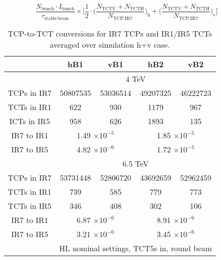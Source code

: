 \begin{equation} \label{eq3}
\frac{N_{\mathrm{bunch}} \cdot I_{\mathrm{bunch}}}{\tau_{\mathrm{stable \, beam}}} \times \Bigg[ \frac{1}{2} \cdot \Big( \frac{N_{\mathrm{TCTV}} + N_{\mathrm{TCTH}}}{N_{\mathrm{TCP.IR7}}}\Big)_{\mathrm{h}} + \Big( \frac{N_{\mathrm{TCTV}} + N_{\mathrm{TCTH}}}{N_{\mathrm{TCP.IR7}}} \Big)_{\mathrm{v}}  \Bigg]
\end{equation}

\begin{table}
   \centering
   \caption{TCP-to-TCT conversions for IR7 TCPs and IR1/IR5 TCTs averaged over simulation h+v case.}

   \begin{tabular}{c|cc|cc}

       & hB1 & vB1 & hB2 & vB2\\ \hline       
       & \multicolumn{4}{c}{4 TeV} \\   %
       TCPs in IR7 & 50807535 & 53036514 & 49207325 & 46222723 \\
       TCTs in IR1 & 622 & 930 & 1179 & 967 \\
       ICTs in IR5 & 958 & 626 & 1893 & 135 \\ %
       IR7 to IR1  & \multicolumn{2}{c|}{1.49 $\times 10^{-5}$} & \multicolumn{2}{c}{1.85 $\times 10^{-5}$ } \\
       IR7 to IR5  & \multicolumn{2}{c|}{4.82 $\times 10^{-6}$} & \multicolumn{2}{c}{1.72 $\times 10^{-5}$ } \\
       \hline
       & \multicolumn{4}{c}{6.5 TeV} \\      
       TCPs in IR7 & 53731448 & 52806720 & 43692659 & 52962459 \\
       TCTs in IR1 & 739 & 585 & 779 & 773 \\
       TCTs in IR5 & 346 & 408 & 302 & 106 \\%
       IR7 to IR1 &  \multicolumn{2}{c|}{6.87 $\times 10^{-6}$} &  \multicolumn{2}{c}{8.91 $\times 10^{-6}$ } \\
       IR7 to IR5 &  \multicolumn{2}{c|}{3.21 $\times 10^{-6}$} &  \multicolumn{2}{c}{3.45 $\times 10^{-6}$ } \\
       \hline       
       & \multicolumn{4}{c}{HL nominal settings, TCT5s in, round beam}  \\ %
       

\end{tabular}
\end{table}
